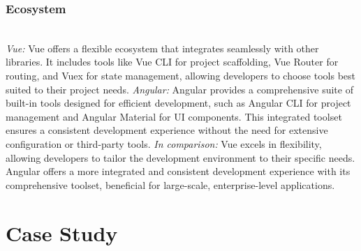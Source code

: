 \documentclass[conference]{IEEEtran}
\begin{document}
\subsubsection{Ecosystem}
\textit{\\Vue:} Vue offers a flexible ecosystem that integrates seamlessly with other libraries. It includes tools like Vue CLI for project scaffolding, Vue Router for routing, and Vuex for state management, allowing developers to choose tools best suited to their project needs.
\newline\textit{Angular:} Angular provides a comprehensive suite of built-in tools designed for efficient development, such as Angular CLI for project management and Angular Material for UI components. This integrated toolset ensures a consistent development experience without the need for extensive configuration or third-party tools.
\newline\textit{In comparison:} Vue excels in flexibility, allowing developers to tailor the development environment to their specific needs. Angular offers a more integrated and consistent development experience with its comprehensive toolset, beneficial for large-scale, enterprise-level applications.
\newline


\section{Case Study}
\label{cha:CaseStudy}


\end{document}
